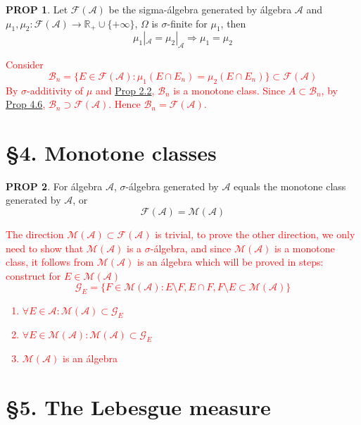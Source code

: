 \documentclass[hidelinks]{article}
\theoremstyle{definition}
\theoremstyle{dotless}
\newtheorem{proposition}{PROP}[section]
\theoremstyle{remark}
\begin{document}
\begin{proposition}\label{Prop 3.5}
Let $\mathscr{F}(\mathscr{A})$ be the sigma-álgebra generated by álgebra $\mathscr{A}$ and $\mu_1,\mu_2:\mathscr{F}(\mathscr{A})\to\mathbb{R}_+\cup\{+\infty\}$, $\Omega$ is $\sigma$-finite for $\mu_1$, then
\[\mu_1|_\mathscr{A}=\mu_2|_\mathscr{A}\Rightarrow\mu_1=\mu_2\]
\end{proposition}
\textcolor{red}{Consider
\[\mathscr{B}_n=\{E\in\mathscr{F}(\mathscr{A}):\mu_1(E\cap E_n)=\mu_2(E\cap E_n)\}\subset\mathscr{F}(\mathscr{A})\]
By $\sigma$-additivity of $\mu$ and \hyperref[Prop 2.2]{Prop 2.2}, $\mathscr{B}_n$ is a monotone class. Since $A\subset\mathscr{B}_n$, by \hyperref[Prop 4.6]{Prop 4.6}, $\mathscr{B}_n\supset\mathscr{F}(\mathscr{A})$. Hence $\mathscr{B}_n=\mathscr{F}(\mathscr{A})$.}

\newpage
\section*{\S4. Monotone classes}
\setcounter{section}{4}

\begin{proposition}\label{Prop 4.6}
For álgebra $\mathscr{A}$, $\sigma$-álgebra generated by $\mathscr{A}$ equals the monotone class generated by $\mathscr{A}$, or \[\mathscr{F}(\mathscr{A})=\mathscr{M}(\mathscr{A})\]
\end{proposition}
\textcolor{red}{The direction $\mathscr{M}(\mathscr{A})\subset\mathscr{F}(\mathscr{A})$ is trivial, to prove the other direction, we only need to show that $\mathscr{M}(\mathscr{A})$ is a $\sigma$-álgebra, and since $\mathscr{M}(\mathscr{A})$ is a monotone class, it follows from $\mathscr{M}(\mathscr{A})$ is an álgebra which will be proved in steps: construct for $E\in\mathscr{M}(\mathscr{A})$
\[\mathscr{G}_E=\{F\in\mathscr{M}(\mathscr{A}):E\setminus F,E\cap F,F\setminus E\subset\mathscr{M}(\mathscr{A})\}\]
\begin{enumerate}[label=\arabic*\degree]
    \item $\forall E\in\mathscr{A}:\mathscr{M}(\mathscr{A})\subset\mathscr{G}_E$
    \item $\forall E\in\mathscr{M}(\mathscr{A}):\mathscr{M}(\mathscr{A})\subset\mathscr{G}_E$
    \item $\mathscr{M}(\mathscr{A})$ is an álgebra
\end{enumerate}}

\newpage
\section*{\S5. The Lebesgue measure}
\setcounter{section}{5}
\end{document}
